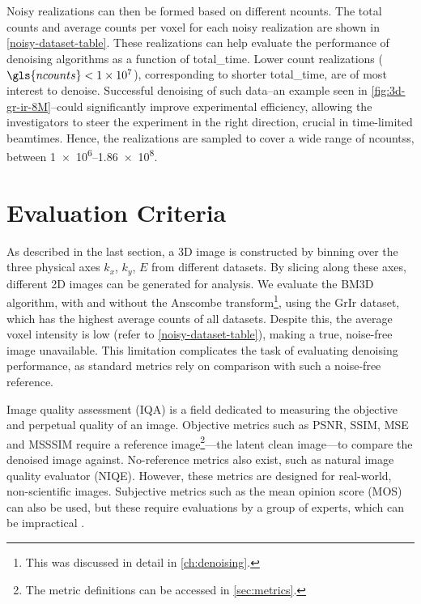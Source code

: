 Noisy realizations can then be formed based on different \gls{ncounts}. The total counts and average counts per voxel for each noisy realization are shown in \cref{noisy-dataset-table}. These realizations can help evaluate the performance of denoising algorithms as a function of \gls{total_time}. Lower count realizations ($\gls{ncounts}<\num{1e7}$), corresponding to shorter \gls{total_time}, are of most interest to denoise. Successful denoising of such data--an example seen in \cref{fig:3d-gr-ir-8M}--could significantly improve experimental efficiency, allowing the investigators to steer the experiment in the right direction, crucial in time-limited \glspl{beamtime}. Hence, the realizations are sampled to cover a wide range of \gls{ncounts}s, between \numrange{1e6}{1.86e8}.

\section{Evaluation Criteria}
As described in the last section, a 3D image is constructed by binning over the three physical axes $k_x$, $k_y$, $E$ from different datasets. By slicing along these axes, different 2D images can be generated for analysis. We evaluate the \gls{BM3D} algorithm, with and without the Anscombe transform\footnote{This was discussed in detail in \cref{ch:denoising}.}, using the \gls{GrIr} dataset, which has the highest average counts of all datasets. Despite this, the average voxel intensity is low (refer to \cref{noisy-dataset-table}), making a true, noise-free image unavailable. This limitation complicates the task of evaluating denoising performance, as standard metrics rely on comparison with such a noise-free reference.

Image quality assessment (IQA) is a field dedicated to measuring the objective and perpetual quality of an image. Objective metrics such as \gls{PSNR}, \gls{SSIM}, \gls{MSE} and \gls{MSSSIM} require a reference image\footnote{The metric definitions can be accessed in \cref{sec:metrics}.}---the latent clean image---to compare the denoised image against. No-reference metrics also exist, such as natural image quality evaluator (NIQE). However, these metrics are designed for real-world, non-scientific images. Subjective metrics such as the mean opinion score (MOS) can also be used, but these require evaluations by a group of experts, which can be impractical \cite{eskiciogluImageQualityMeasures1995,linzhangFSIMFeatureSimilarity2011}.

